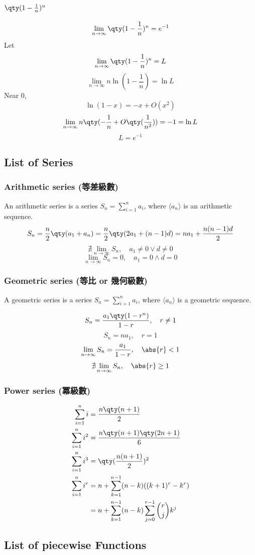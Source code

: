 \documentclass[a4paper,12pt]{report}
\begin{document}
\begin{itemize}
\begin{itemize}
\subsubsection{$\qty(1-\frac{1}{n})^n$}
\[\lim_{n\to\infty}\qty(1-\frac{1}{n})^n=e^{-1}\]
\bpr
Let
\[\lim_{n\to\infty}\qty(1-\frac{1}{n})^n=L\]
\[\lim_{n\to\infty}n\ln(1-\frac{1}{n})=\ln L\]
Near 0,
\[\ln(1-x)=-x+O(x^2)\]
\[\lim_{n\to\infty}n\qty(-\frac{1}{n}+O\qty(\frac{1}{n^2}))=-1=\ln L\]
\[L=e^{-1}\]
\epr
\subsection{List of Series}
\subsubsection{Arithmetic series (等差級數)}
An arithmetic series is a series $S_n=\sum_{i=1}^na_i$, where $\langle a_n\rangle$ is an arithmetic sequence.
\[S_n=\frac{n}{2}\qty(a_1+a_n)=\frac{n}{2}\qty(2a_1+(n-1)d)=na_1+\frac{n(n-1)d}{2}\]
\[\nexists\lim_{n\to\infty}S_n,\quad a_1\neq 0\lor d\neq 0\]
\[\lim_{n\to\infty}S_n=0,\quad a_1=0\land d=0\]
\subsubsection{Geometric series (等比 or 幾何級數)}
A geometric series is a series $S_n=\sum_{i=1}^na_i$, where $\langle a_n\rangle$ is a geometric sequence.

\[S_n=\frac{a_1\qty(1-r^n)}{1-r},\quad r\neq 1\]
\[S_n=na_1,\quad r=1\]
\[\lim_{n\to\infty}S_n=\frac{a_1}{1-r},\quad \abs{r}<1\]
\[\nexists\lim_{n\to\infty}S_n,\quad \abs{r}\geq 1\]
\subsubsection{Power series (冪級數)}
\[\begin{aligned}
\sum_{i=1}^ni &= \frac{n\qty(n+1)}{2}\\
\sum_{i=1}^ni^2 &= \frac{n\qty(n+1)\qty(2n+1)}{6}\\
\sum_{i=1}^ni^3 &= \qty(\frac{n(n+1)}{2})^2\\
\sum_{i=1}^ni^r &= n + \sum_{k=1}^{n-1} (n-k)((k+1)^r - k^r)\\
&= n + \sum_{k=1}^{n-1} (n-k)\sum_{j=0}^{r-1}\binom{r}{j}k^{j}
\end{aligned}\]
\subsection{List of piecewise Functions}

\end{itemize}
\end{itemize}
\end{document}
